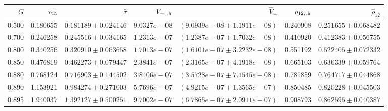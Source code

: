 \begin{tabular}{@{}rrrrrrr@{}}
\toprule
$G$ & $\tau_{\rm th}$ & $\widehat\tau$ & $V_{+,\rm th}$ & $\widehat V_+$ & $\rho_{12,\rm th}$ & $\widehat\rho_{12}$ \\
\midrule
0.500 & 0.180655 & $0.181189\pm0.024146$ & $9.0327e-08$ & $(9.0939e-08\pm1.1911e-08)$ & 0.240908 & $0.251655\pm0.068482$ \\
0.700 & 0.246258 & $0.245516\pm0.034165$ & $1.2313e-07$ & $(1.2387e-07\pm1.7032e-08)$ & 0.410920 & $0.412383\pm0.056755$ \\
0.800 & 0.340256 & $0.320910\pm0.063658$ & $1.7013e-07$ & $(1.6101e-07\pm3.2232e-08)$ & 0.551192 & $0.522405\pm0.072332$ \\
0.850 & 0.476819 & $0.462273\pm0.079447$ & $2.3841e-07$ & $(2.3165e-07\pm4.1918e-08)$ & 0.665103 & $0.636339\pm0.059764$ \\
0.880 & 0.768124 & $0.716903\pm0.144502$ & $3.8406e-07$ & $(3.5728e-07\pm7.1545e-08)$ & 0.781859 & $0.764717\pm0.044868$ \\
0.890 & 1.153921 & $0.984274\pm0.271003$ & $5.7696e-07$ & $(4.9215e-07\pm1.3565e-07)$ & 0.850485 & $0.820228\pm0.045503$ \\
0.895 & 1.940037 & $1.392127\pm0.500251$ & $9.7002e-07$ & $(6.7865e-07\pm2.0911e-07)$ & 0.908793 & $0.862595\pm0.040387$ \\
\bottomrule
\end{tabular}
